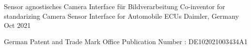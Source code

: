 
\begin{cventries}
  \cventry
    {Sensor agnostisches Camera Interface für Bildverarbeitung}
    {Co-inventor for standarizing Camera Sensor Interface for Automobile ECUs}
    {Daimler, Germany}
    {Oct 2021}
    {
      \begin{cvitems}
      \item { German Patent and Trade Mark Office Publication Number : DE102021003434A1}
      \end{cvitems}
    }


\end{cventries}
